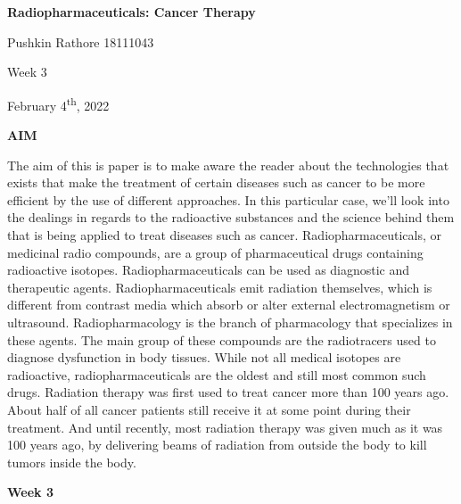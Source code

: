 \documentclass[
]{article}
\author{}
\date{}
\begin{document}
\textbf{{Radiopharmaceuticals: Cancer Therapy}}

Pushkin Rathore 18111043

Week 3

February 4\textsuperscript{th}, 2022

\textbf{AIM}

The aim of this is paper is to make aware the reader about the
technologies that exists that make the treatment of certain diseases
such as cancer to be more efficient by the use of different approaches.
In this particular case, we'll look into the dealings in regards to the
radioactive substances and the science behind them that is being applied
to treat diseases such as cancer. Radiopharmaceuticals, or medicinal
radio compounds, are a group of pharmaceutical drugs containing
radioactive isotopes. Radiopharmaceuticals can be used as diagnostic and
therapeutic agents. Radiopharmaceuticals emit radiation themselves,
which is different from contrast media which absorb or alter external
electromagnetism or ultrasound. Radiopharmacology is the branch of
pharmacology that specializes in these agents. The main group of these
compounds are the radiotracers used to diagnose dysfunction in body
tissues. While not all medical isotopes are radioactive,
radiopharmaceuticals are the oldest and still most common such drugs.
Radiation therapy was first used to treat cancer more than 100 years
ago. About half of all cancer patients still receive it at some point
during their treatment. And until recently, most radiation therapy was
given much as it was 100 years ago, by delivering beams of radiation
from outside the body to kill tumors inside the body.

\textbf{Week 3}
\end{document}
